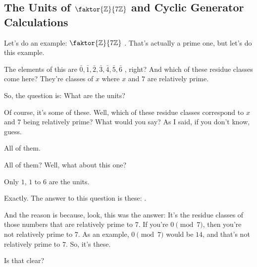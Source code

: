 \subsection{The Units of \texorpdfstring{$\faktor{\mathbb{Z}}{7\mathbb{Z}}$}{Z/7Z} and Cyclic Generator Calculations}

\begin{speech}[00:35:02 - 00:36:08]
Let's do an example: $\faktor{\mathbb{Z}}{7\mathbb{Z}}$ . That's actually a prime one, but let's do this example.

The elements of this are $\bar{0}, \bar{1}, \bar{2}, \bar{3}, \bar{4}, \bar{5}, \bar{6}$ , right? And which of these residue classes come here? They're classes of $x$ where $x$ and $7$ are relatively prime.

So, the question is: What are the units? 

Of course, it's some of these. Well, which of these residue classes correspond to $x$ and $7$ being relatively prime? What would you say? As I said, if you don't know, guess.
\end{speech}

\begin{student}
All of them.
\end{student}

\begin{speech}[00:36:11 - 00:36:14]
All of them? Well, what about this one? 
\end{speech}

\begin{student}
Only $1$, $1$ to $6$ are the units.
\end{student}

\begin{speech}[00:36:16 - 00:36:50]
Exactly. The answer to this question is these: .

And the reason is because, look, this was the answer: It's the residue classes of those numbers that are relatively prime to $7$. If you're $0 \pmod 7$, then you're not relatively prime to $7$. As an example, $0 \pmod 7$ would be $14$, and that's not relatively prime to $7$. So, it's these.

Is that clear?
\end{speech}

